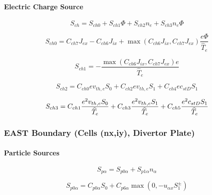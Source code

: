 \documentclass[11pt]{article}
\begin{document}
\bigskip

\paragraph{Electric Charge Source}

\begin{equation}
S_{ch}=S_{ch0}+S_{ch1}\Phi+S_{ch2}n_{e}+S_{ch3}n_{e}\Phi   \label{85}
\end{equation}

\begin{equation}
S_{ch0}=C_{ch7}J_{ex}-C_{ch6}J_{ix}+\max\left(
C_{ch6}J_{ix},C_{ch7}J_{ex}\right) \frac{e\Phi}{\widehat{T}_{e}}   \label{86}
\end{equation}
\bigskip

\begin{equation}
S_{ch1}=-\frac{\max\left( C_{ch6}J_{ix},C_{ch7}J_{ex}\right) e}{\widehat
{T}_{e}}   \label{87}
\end{equation}

\begin{equation}
S_{ch2}=C_{ch0}ev_{th,e}S_{0}+C_{ch2}ev_{th,e}S_{1}+C_{ch4}ec_{stD}S_{1} 
\label{88}
\end{equation}

\begin{equation}
S_{ch3}=C_{ch1}\frac{e^{2}v_{th,e}S_{0}}{\widehat{T}_{e}}+C_{ch3}\frac
{e^{2}v_{th,e}S_{1}}{\widehat{T}_{e}}+C_{ch5}\frac{e^{2}c_{stD}S_{1}}{%
\widehat{T}_{e}}   \label{89}
\end{equation}

\bigskip

\subsubsection{EAST Boundary (Cells (nx,iy), Divertor Plate)}

\bigskip

\paragraph{Particle Sources}

\begin{equation}
S_{p\alpha}=S_{p0\alpha}+S_{p1\alpha}n_{\alpha}   \label{90}
\end{equation}

\begin{equation}
S_{p0\alpha}=C_{p0\alpha}S_{0}+C_{p6\alpha}\max\left( 0,-u_{\alpha
x}S_{1}^{\pm}\right)   \label{91}
\end{equation}
\end{document}
